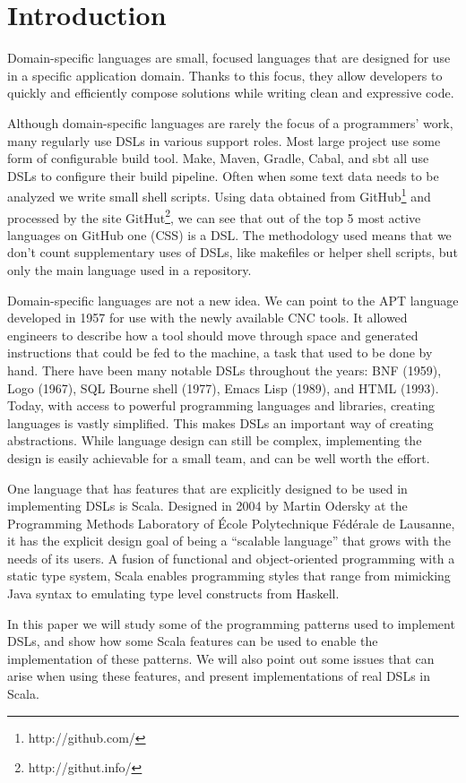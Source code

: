 \chapter{Introduction}

Domain-specific languages are small, focused languages that are designed for use in a specific application domain.
Thanks to this focus, they allow developers to quickly and efficiently compose solutions while writing clean and expressive code.

Although domain-specific languages are rarely the focus of a programmers' work, many regularly use DSLs in various support roles.
Most large project use some form of configurable build tool.
Make, Maven, Gradle, Cabal, and sbt all use DSLs to configure their build pipeline.
Often when some text data needs to be analyzed we write small shell scripts.
Using data obtained from GitHub\footnote{http://github.com/} and processed by the site GitHut\footnote{http://githut.info/}, we can see that out of the top 5 most active languages on GitHub one (CSS) is a DSL.
The methodology used means that we don't count supplementary uses of DSLs, like makefiles or helper shell scripts, but only the main language used in a repository.

Domain-specific languages are not a new idea.
We can point to the APT language developed in 1957 \cite{Ross:1978} for use with the newly available CNC tools.
It allowed engineers to describe how a tool should move through space and generated instructions that could be fed to the machine, a task that used to be done by hand.
There have been many notable DSLs throughout the years: BNF (1959), Logo (1967), SQL Bourne shell (1977), Emacs Lisp (1989), and HTML (1993).
Today, with access to powerful programming languages and libraries, creating languages is vastly simplified.
This makes DSLs an important way of creating abstractions.
While language design can still be complex, implementing the design is easily achievable for a small team, and can be well worth the effort.

One language that has features that are explicitly designed to be used in implementing DSLs is Scala.
Designed in 2004 by Martin Odersky at the Programming Methods Laboratory of \'Ecole Polytechnique F\'ed\'erale de Lausanne, it has the explicit design goal of being a \enquote{scalable language} that grows with the needs of its users.
A fusion of functional and object-oriented programming with a static type system, Scala enables programming styles that range from mimicking Java syntax to emulating type level constructs from Haskell.

In this paper we will study some of the programming patterns used to implement DSLs, and show how some Scala features can be used to enable the implementation of these patterns.
We will also point out some issues that can arise when using these features, and present implementations of real DSLs in Scala.